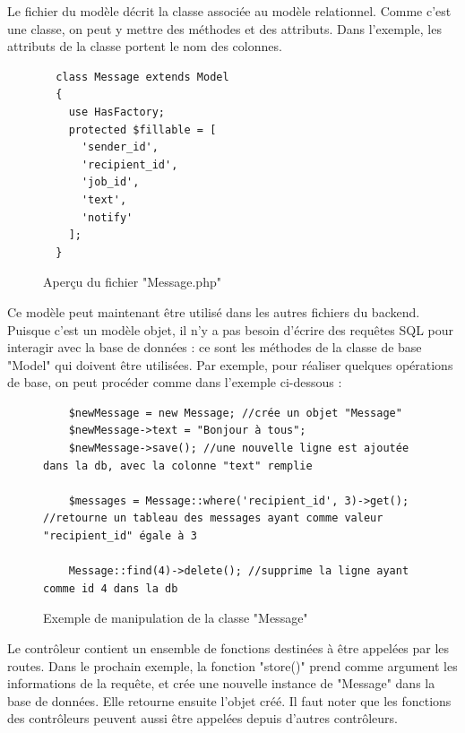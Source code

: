 \documentclass[
    iai, %
    eai, %
]{heig-tb}
\begin{document}
\newpage
Le fichier du modèle décrit la classe associée au modèle relationnel. Comme c'est une classe, on peut y mettre des méthodes et des attributs. Dans l'exemple, les attributs de la classe portent le nom des colonnes.

\begin{figure}[h]
  \begin{verbatim}
  class Message extends Model
  {
    use HasFactory;
    protected $fillable = [
      'sender_id',
      'recipient_id',
      'job_id',
      'text',
      'notify'
    ];
  }
  \end{verbatim}
  \caption{Aperçu du fichier "Message.php"}
\end{figure}

Ce modèle peut maintenant être utilisé dans les autres fichiers du backend. Puisque c'est un modèle objet, il n'y a pas besoin d'écrire des requêtes SQL pour interagir avec la base de données : ce sont les méthodes de la classe de base "Model" qui doivent être utilisées. Par exemple, pour réaliser quelques opérations de base, on peut procéder comme dans l'exemple ci-dessous :

\begin{figure}[h]
  \begin{verbatim}
    $newMessage = new Message; //crée un objet "Message"
    $newMessage->text = "Bonjour à tous";
    $newMessage->save(); //une nouvelle ligne est ajoutée dans la db, avec la colonne "text" remplie

    $messages = Message::where('recipient_id', 3)->get(); //retourne un tableau des messages ayant comme valeur "recipient_id" égale à 3

    Message::find(4)->delete(); //supprime la ligne ayant comme id 4 dans la db
  \end{verbatim}
  \caption{Exemple de manipulation de la classe "Message"}
\end{figure}

Le contrôleur contient un ensemble de fonctions destinées à être appelées par les routes. Dans le prochain exemple, la fonction "store()" prend comme argument les informations de la requête, et crée une nouvelle instance de "Message" dans la base de données. Elle retourne ensuite l'objet créé. Il faut noter que les fonctions des contrôleurs peuvent aussi être appelées depuis d'autres contrôleurs.

\newpage
\end{document}
